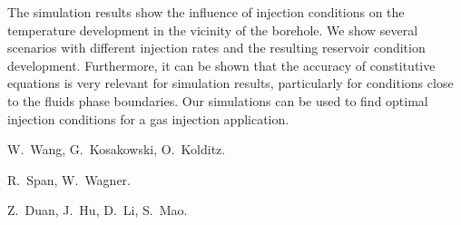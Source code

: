 The simulation results show the influence of injection conditions on the temperature development in the vicinity of the borehole. We show several scenarios with different injection rates and the resulting reservoir condition development. Furthermore, it can be shown that the accuracy of constitutive equations is very relevant for simulation results, particularly for conditions close to the fluids phase boundaries. Our simulations can be used to find optimal injection conditions for a gas injection application.


\begin{thebibliography}{10}
{\sc W.~Wang, G.~Kosakowski, O.~Kolditz}. 

{\sc R.~Span, W.~Wagner}. 

{\sc Z.~Duan, J.~Hu, D.~Li, S.~Mao}. 
\end{thebibliography}